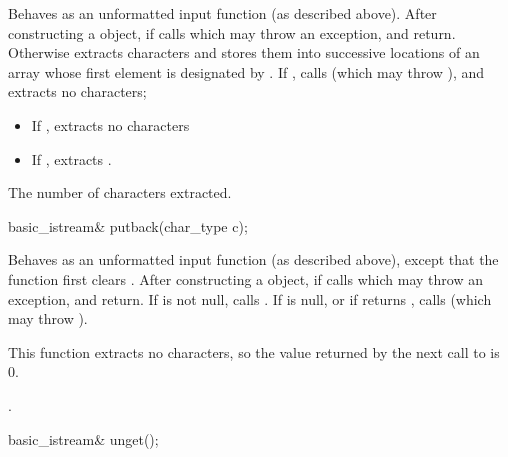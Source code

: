 \begin{itemdescr}
\pnum
\effects
Behaves as an unformatted input function (as described above).
After constructing
a  object, if
calls
which may throw an exception,
and return.
Otherwise extracts characters and stores them
into successive locations of an array whose first element is designated by
.
If
,
calls
(which may throw
),
and extracts no characters;
\begin{itemize}
\item
If
,
extracts no characters
\item
If
,
extracts
.
\end{itemize}

\pnum
\returns
The number of characters extracted.
\end{itemdescr}

%
\begin{itemdecl}
basic_istream& putback(char_type c);
\end{itemdecl}

\begin{itemdescr}
\pnum
\effects
Behaves as an unformatted input function (as described above), except that the function first clears .
After constructing
a  object, if
calls
which may throw an exception,
and return.
If
is not null, calls
.
If
is null, or if
returns
,
calls
(which may throw
).
\begin{note}
This
function extracts no characters, so the value returned by the next call to
is 0.
\end{note}

\pnum
\returns
{}.
\end{itemdescr}

%
\begin{itemdecl}
basic_istream& unget();
\end{itemdecl}

